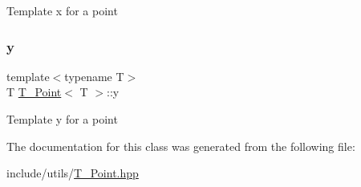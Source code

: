 Template x for a point \mbox{\label{classPoint_a65146418a33ebb2cd9acb85cade60ac9}} 
\subsubsection{\texorpdfstring{y}{y}}
{\footnotesize\ttfamily template$<$typename T$>$ \\
T \hyperlink{classPoint}{T_Point}$<$ T $>$\+::y}

Template y for a point 

The documentation for this class was generated from the following file\+:\begin{DoxyCompactItemize}
\item 
include/utils/\hyperlink{Point_8hpp}{T_Point.\+hpp}\end{DoxyCompactItemize}
